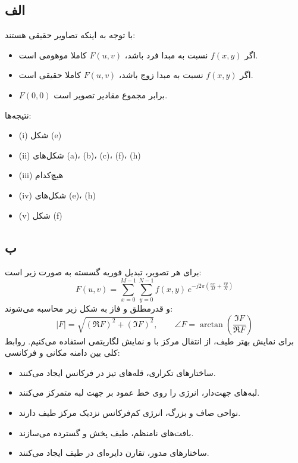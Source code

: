 \subsection*{الف}
با توجه به اینکه تصاویر حقیقی هستند:
\begin{itemize}
\item اگر $f(x,y)$ نسبت به مبدا فرد باشد، $F(u,v)$ کاملا موهومی است.
\item اگر $f(x,y)$ نسبت به مبدا زوج باشد، $F(u,v)$ کاملا حقیقی است.
\item $F(0,0)$ برابر مجموع مقادیر تصویر است.
\end{itemize}
نتیجه‌ها:
\begin{itemize}
\item (i) شکل (e)
\item (ii) شکل‌های (a)، (b)، (c)، (f)، (h)
\item (iii) هیچ‌کدام
\item (iv) شکل‌های (e)، (h)
\item (v) شکل (f)
\end{itemize}

\subsection*{ب}
برای هر تصویر، تبدیل فوریه گسسته به صورت زیر است:
$$
F(u,v)=\sum_{x=0}^{M-1}\sum_{y=0}^{N-1} f(x,y)\,e^{-j2\pi\left(\frac{ux}{M}+\frac{vy}{N}\right)}
$$
و قدرمطلق و فاز به شکل زیر محاسبه می‌شوند:
$$
|F|=\sqrt{(\Re F)^2+(\Im F)^2}, \qquad
\angle F=\arctan\left(\frac{\Im F}{\Re F}\right)
$$
برای نمایش بهتر طیف، از انتقال مرکز با  و نمایش لگاریتمی  استفاده می‌کنیم. روابط کلی بین دامنه مکانی و فرکانسی:
\begin{itemize}
\item ساختارهای تکراری، قله‌های تیز در فرکانس ایجاد می‌کنند.
\item لبه‌های جهت‌دار، انرژی را روی خط عمود بر جهت لبه متمرکز می‌کنند.
\item نواحی صاف و بزرگ، انرژی کم‌فرکانس نزدیک مرکز طیف دارند.
\item بافت‌های نامنظم، طیف پخش و گسترده می‌سازند.
\item ساختارهای مدور، تقارن دایره‌ای در طیف ایجاد می‌کنند.
\end{itemize}